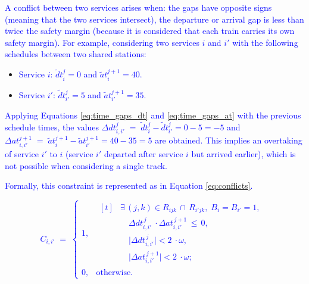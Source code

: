 \documentclass[Afour,sagev,times]{sagej}
\newcommand{\primero}[1]{\textcolor{blue}{#1}}
\begin{document}
\primero{A conflict between two services arises when: the gaps have opposite signs (meaning that the two services intersect), the departure or arrival gap is less than twice the safety margin (because it is considered that each train carries its own safety margin). For example, considering two services $ i $ and $ i' $ with the following schedules between two shared stations: }

\begin{itemize}
    \item \primero{Service $ i $: $ \tilde dt_{i}^{j} = 0 $ and $ \tilde at_{i}^{j+1} = 40 $.}
    \item \primero{Service $ i' $: $ \tilde dt_{i'}^{j} = 5 $ and $ \tilde at_{i'}^{j+1} = 35 $.}
\end{itemize}

\primero{Applying Equations  \ref{eq:time_gaps_dt} and \ref{eq:time_gaps_at} with the previous schedule times, the values $ \Delta dt_{i,i'}^{j} \;=\; \tilde dt_{i}^{j} - \tilde dt_{i'}^{j} = 0 - 5 = - 5 $ and $ \Delta at_{i,i'}^{j+1} \;=\; \tilde at_{i}^{j+1} - \tilde at_{i'}^{j+1} = 40 - 35 = 5 $ are obtained. This implies an overtaking of service  $ i' $ to $ i $ (service $ i' $ departed after service $ i $ but arrived earlier), which is not possible when considering a single track.}

\primero{Formally, this constraint is represented as in Equation \ref{eq:conflicts}.}


\primero{
\begin{equation}
C_{i,i'} \;=\;
\begin{cases}
1, & 
\begin{aligned}[t]
&\exists\,(j,k)\in R_{ijk}\,\cap\,R_{i'jk},\;B_{i}=B_{i'}=1,\; \\
&\quad \Delta dt_{i,i'}^{\,j}\ \cdot \Delta at_{i,i'}^{\,j+1} \,\le\,0,\\
&\quad \bigl|\Delta dt_{i,i'}^{\,j}\bigr| < 2\ \cdot \omega,\\
&\quad \bigl|\Delta at_{i,i'}^{\,j+1}\bigr| < 2\ \cdot \omega;
\end{aligned}
\\[2ex]
0, & \text{otherwise.}
\end{cases}
\label{eq:conflicts}
\end{equation}
}
\end{document}
